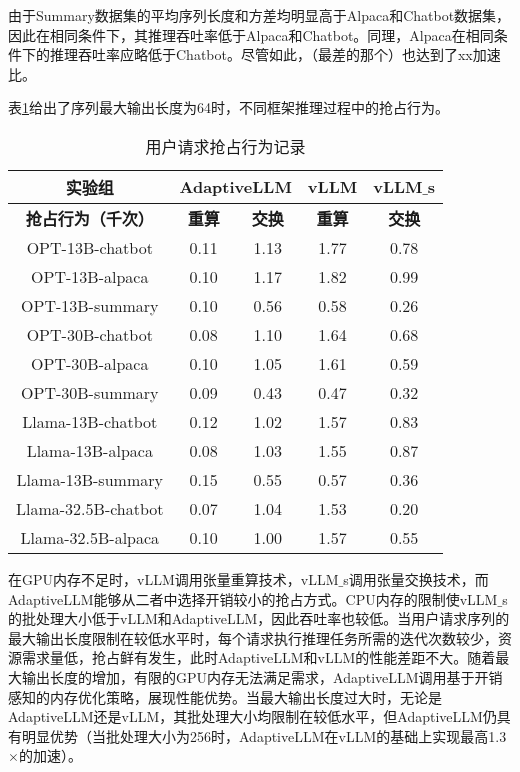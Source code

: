 由于Summary数据集的平均序列长度和方差均明显高于Alpaca和Chatbot数据集，因此在相同条件下，其推理吞吐率低于Alpaca和Chatbot。同理，Alpaca在相同条件下的推理吞吐率应略低于Chatbot。尽管如此，（最差的那个）也达到了xx加速比。

表\ref{Table:用户请求抢占行为记录}给出了序列最大输出长度为64时，不同框架推理过程中的抢占行为。 \par

\begin{table}[H]
  \centering
  \caption{用户请求抢占行为记录}
  \label{Table:用户请求抢占行为记录}
  \renewcommand{\arraystretch}{1.25}
  \small
  \begin{tabular}{c c c c c}
    \toprule
    \textbf{实验组} & \multicolumn{2}{c}{\textbf{AdaptiveLLM}} & \textbf{vLLM} & \textbf{vLLM$\_$s} \\
    \midrule
    \textbf{抢占行为（千次）} & \textbf{重算} & \textbf{交换} & \textbf{重算} & \textbf{交换} \\
    \midrule
    OPT-13B-chatbot & 0.11 & 1.13 & 1.77 & 0.78 \\
    OPT-13B-alpaca & 0.10 & 1.17 & 1.82 & 0.99 \\
    OPT-13B-summary & 0.10 & 0.56 & 0.58 & 0.26 \\
    OPT-30B-chatbot & 0.08 & 1.10 & 1.64 & 0.68 \\
    OPT-30B-alpaca & 0.10 & 1.05 & 1.61 & 0.59 \\
    OPT-30B-summary & 0.09 & 0.43 & 0.47 & 0.32 \\
    Llama-13B-chatbot & 0.12 & 1.02 & 1.57 & 0.83 \\
    Llama-13B-alpaca & 0.08 & 1.03 & 1.55 & 0.87 \\
    Llama-13B-summary & 0.15 & 0.55 & 0.57 & 0.36 \\
    Llama-32.5B-chatbot & 0.07 & 1.04 & 1.53 & 0.20 \\
    Llama-32.5B-alpaca & 0.10 & 1.00 & 1.57 & 0.55 \\
    \bottomrule
  \end{tabular}
\end{table}

在GPU内存不足时，vLLM调用张量重算技术，vLLM$\_$s调用张量交换技术，而AdaptiveLLM能够从二者中选择开销较小的抢占方式。CPU内存的限制使vLLM$\_$s的批处理大小低于vLLM和AdaptiveLLM，因此吞吐率也较低。当用户请求序列的最大输出长度限制在较低水平时，每个请求执行推理任务所需的迭代次数较少，资源需求量低，抢占鲜有发生，此时AdaptiveLLM和vLLM的性能差距不大。随着最大输出长度的增加，有限的GPU内存无法满足需求，AdaptiveLLM调用基于开销感知的内存优化策略，展现性能优势。当最大输出长度过大时，无论是AdaptiveLLM还是vLLM，其批处理大小均限制在较低水平，但AdaptiveLLM仍具有明显优势（当批处理大小为256时，AdaptiveLLM在vLLM的基础上实现最高1.3$\times$的加速）。\par

